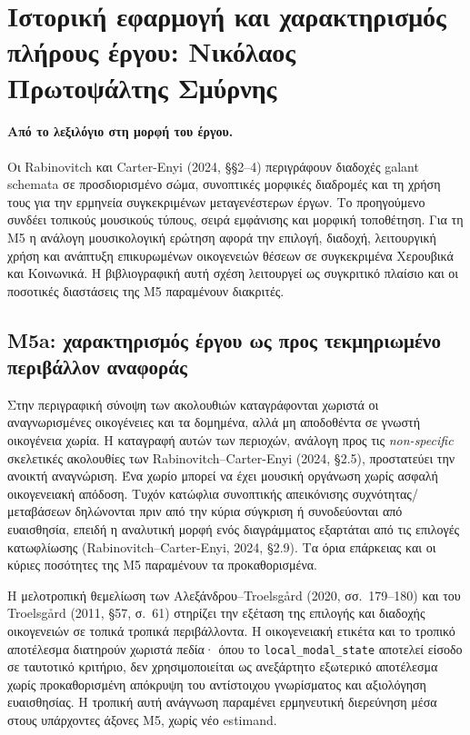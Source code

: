 \documentclass[11pt,a4paper]{article}
\begin{document}
\section{Ιστορική εφαρμογή και χαρακτηρισμός πλήρους έργου: Νικόλαος Πρωτοψάλτης Σμύρνης}\label{sec:nikolaos}

\paragraph{Από το λεξιλόγιο στη μορφή του έργου.} Οι Rabinovitch και Carter-Enyi (2024, §§2--4) περιγράφουν διαδοχές galant schemata σε προσδιορισμένο σώμα, συνοπτικές μορφικές διαδρομές και τη χρήση τους για την ερμηνεία συγκεκριμένων μεταγενέστερων έργων. Το προηγούμενο συνδέει τοπικούς μουσικούς τύπους, σειρά εμφάνισης και μορφική τοποθέτηση. Για τη M5 η ανάλογη μουσικολογική ερώτηση αφορά την επιλογή, διαδοχή, λειτουργική χρήση και ανάπτυξη επικυρωμένων οικογενειών θέσεων σε συγκεκριμένα Χερουβικά και Κοινωνικά. Η βιβλιογραφική αυτή σχέση λειτουργεί ως συγκριτικό πλαίσιο και οι ποσοτικές διαστάσεις της M5 παραμένουν διακριτές.

\subsection{M5a: χαρακτηρισμός έργου ως προς τεκμηριωμένο περιβάλλον αναφοράς}\label{sec:m5-reference}

Στην περιγραφική σύνοψη των ακολουθιών καταγράφονται χωριστά οι αναγνωρισμένες οικογένειες και τα δομημένα, αλλά μη αποδοθέντα σε γνωστή οικογένεια χωρία. Η καταγραφή αυτών των περιοχών, ανάλογη προς τις \emph{non-specific} σκελετικές ακολουθίες των Rabinovitch--Carter-Enyi (2024, §2.5), προστατεύει την ανοικτή αναγνώριση. Ένα χωρίο μπορεί να έχει μουσική οργάνωση χωρίς ασφαλή οικογενειακή απόδοση. Τυχόν κατώφλια συνοπτικής απεικόνισης συχνότητας/μεταβάσεων δηλώνονται πριν από την κύρια σύγκριση ή συνοδεύονται από ευαισθησία, επειδή η αναλυτική μορφή ενός διαγράμματος εξαρτάται από τις επιλογές κατωφλίωσης (Rabinovitch--Carter-Enyi, 2024, §2.9). Τα όρια επάρκειας και οι κύριες ποσότητες της M5 παραμένουν τα προκαθορισμένα.

Η μελοτροπική θεμελίωση των Αλεξάνδρου--Troelsgård (2020, σσ.~179--180) και του Troelsgård (2011, §57, σ.~61) στηρίζει την εξέταση της επιλογής και διαδοχής οικογενειών σε τοπικά τροπικά περιβάλλοντα. Η οικογενειακή ετικέτα και το τροπικό αποτέλεσμα διατηρούν χωριστά πεδία· όπου το \texttt{local\_modal\_state} αποτελεί είσοδο σε ταυτοτικό κριτήριο, δεν χρησιμοποιείται ως ανεξάρτητο εξωτερικό αποτέλεσμα χωρίς προκαθορισμένη απόκρυψη του αντίστοιχου γνωρίσματος και αξιολόγηση ευαισθησίας. Η τροπική αυτή ανάγνωση παραμένει ερμηνευτική διερεύνηση μέσα στους υπάρχοντες άξονες M5, χωρίς νέο estimand.
\end{document}
